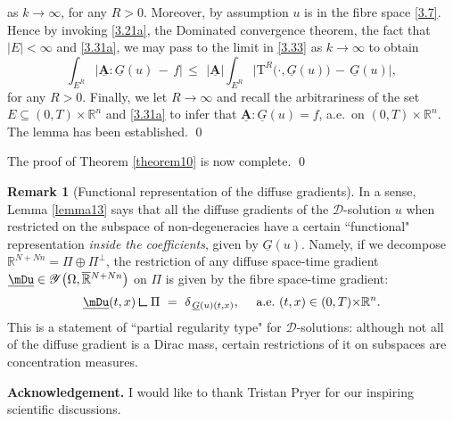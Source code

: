 \documentclass{amsart}
\theoremstyle{definition}
\newtheorem{remark}[theorem]{Remark}
\numberwithin{equation}{section}
\begin{document}
as $k{\rightarrow} \infty$, for any $R>0$. Moreover, by assumption $u$ is in the fibre space \eqref{3.7}. Hence by invoking \eqref{3.21a}, the Dominated convergence theorem, the fact that $|E|<\infty$ and \eqref{3.31a}, we may pass to the limit in \eqref{3.33} as $k{\rightarrow} \infty$ to obtain
\[
\int_{E^R }  \Big|  {\underline{\textbf{A}}} : \underline{G}(u) \,-\, f  \Big| \, \leq \, \ |{\underline{\textbf{A}}} |\int_{E^R }  \Big|   \text{T}^R\big(\cdot,\underline{G}(u)  \big)\,-\,  \underline{G}(u) \Big|,
\]
for any $R>0$. Finally, we let $R{\rightarrow} \infty$ and recall the arbitrariness of the set $E{\subseteq} (0,T){\times}{\mathbb{R}}^n$ and \eqref{3.31a} to infer that $ {\underline{\textbf{A}}} : \underline{G}(u) =f$, a.e.\ on $ (0,T){\times}{\mathbb{R}}^n$. The lemma has been established.     \qed

{\medskip}

The proof of Theorem \ref{theorem10} is now complete.             \qed

{\medskip}

\begin{remark}[Functional representation of the diffuse gradients] \label{remark15} In a sense, Lemma \ref{lemma13} says that all the diffuse gradients of the ${\mathcal{D}}$-solution $u$ when restricted on the subspace of non-degeneracies have a certain ``functional" representation \emph{inside the coefficients}, given by $\underline{G}(u)$. Namely, if we decompose ${\mathbb{R}}^{N+Nn}=\Pi \oplus \Pi^\bot$, the restriction of any diffuse space-time gradient $\underline\mDu \in {\mathscr{Y}}\big({\Omega}, \smash{\overline{\mathbb{R}}}^{N+Nn}\big)$ on $\Pi$ is given by the fibre space-time gradient:
\[
\underline\mDu(t,x)\,{\text{\LARGE$\llcorner$}} \, \Pi\  =\ {\delta}_{\,\underline{G}(u)(t,x)},\ \ \ \text{ a.e.\ }(t,x) \in (0,T){\times} {\mathbb{R}}^n.  
\]
This is a statement of ``partial regularity type" for ${\mathcal{D}}$-solutions: although not all of the diffuse gradient is a Dirac mass, certain restrictions of it on subspaces are concentration measures.
\end{remark}

{\medskip}

{\noindent} \textbf{Acknowledgement.} I would like to thank Tristan Pryer for our inspiring scientific discussions.
\end{document}
